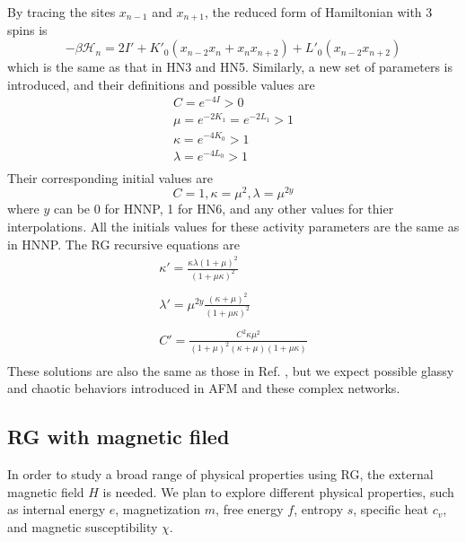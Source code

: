 By tracing the sites $x_{n-1}$ and $x_{n+1}$, the reduced form of Hamiltonian with 3 spins is
\begin{equation}
\label{eq:hnnpz1}
 -\beta \mathcal{H}_n = 2I' +  K'_0 \left(x_{n-2}x_{n} +  x_{n}x_{n+2}\right) + L'_0(x_{n-2}x_{n+2})
 \end{equation}
 which is the same as that in HN3 and HN5. Similarly, a new set of parameters is introduced, and their definitions and possible values are  
 \begin{equation}
\begin{array}{l}
\displaystyle C = e^{-4I} > 0   \\
\displaystyle \mu = e^{-2K_1} = e^{-2L_1} > 1 \\
\displaystyle \kappa = e^{-4K_0} > 1 \\
\displaystyle \lambda = e^{-4L_0}  > 1\\
\end{array} 
\label{eq:hn35-activities}
\end{equation}
Their corresponding initial values are 
 \begin{equation}
 C = 1,  \kappa = \mu^2,  \lambda =  \mu^{2y} 
\label{eq:hp-init2}
\end{equation}
where $y$ can be 0 for HNNP, 1 for HN6, and any other values for thier interpolations. All the initials values for these activity parameters are the same as in HNNP. The RG recursive equations are
\begin{equation}
\begin{array}{l}
\displaystyle \kappa' = \frac{\kappa \lambda (1+\mu)^2 }{(1+\mu\kappa)^2} \\
\\
\displaystyle \lambda' =\mu^{2y} \frac{(\kappa + \mu)^2} {(1 + \mu \kappa)^2} \\ \\
\displaystyle C' =  \frac{C^2 \kappa\mu^2} {(1+\mu)^2 (\kappa+\mu) (1+ \mu\kappa)}   \\
\end{array} 
\label{eq:afm-hpsol1}
\end{equation}
These solutions are also the same as those in Ref. \cite{Boettcher2011HNNP}, but we expect possible glassy and chaotic behaviors introduced in AFM and these complex networks.


\subsection{RG with magnetic filed}
\label{sec:afm-rgbf}
In order to study a broad range of physical properties using RG, the external magnetic field $H$ is needed. We plan to explore different physical properties, such as internal energy $e$, magnetization $m$, free energy $f$, entropy $s$, specific heat $c_v$, and magnetic susceptibility $\chi$. 

